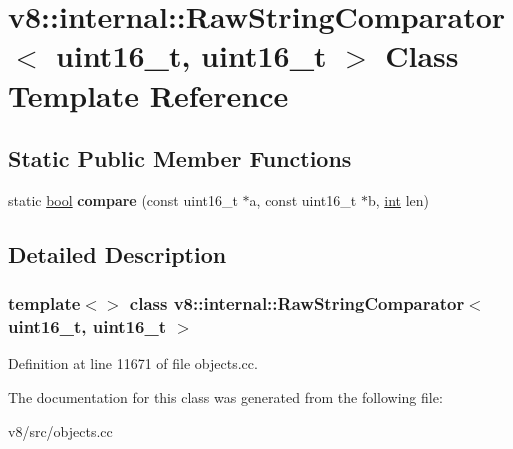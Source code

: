\hypertarget{classv8_1_1internal_1_1RawStringComparator_3_01uint16__t_00_01uint16__t_01_4}{}\section{v8\+:\+:internal\+:\+:Raw\+String\+Comparator$<$ uint16\+\_\+t, uint16\+\_\+t $>$ Class Template Reference}
\label{classv8_1_1internal_1_1RawStringComparator_3_01uint16__t_00_01uint16__t_01_4}
\subsection*{Static Public Member Functions}
\begin{DoxyCompactItemize}
\item 
\mbox{\label{classv8_1_1internal_1_1RawStringComparator_3_01uint16__t_00_01uint16__t_01_4_ab0afdcfb4e2f09e9c15e2aa8e5d4e8b5}} 
static \mbox{\hyperlink{classbool}{bool}} {\bfseries compare} (const uint16\+\_\+t $\ast$a, const uint16\+\_\+t $\ast$b, \mbox{\hyperlink{classint}{int}} len)
\end{DoxyCompactItemize}


\subsection{Detailed Description}
\subsubsection*{template$<$$>$\newline
class v8\+::internal\+::\+Raw\+String\+Comparator$<$ uint16\+\_\+t, uint16\+\_\+t $>$}



Definition at line 11671 of file objects.\+cc.



The documentation for this class was generated from the following file\+:\begin{DoxyCompactItemize}
\item 
v8/src/objects.\+cc\end{DoxyCompactItemize}
